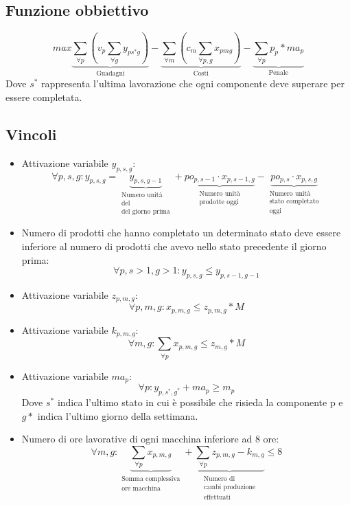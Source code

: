 \documentclass[12pt]{article}
\begin{document}
	\subsection{Funzione obbiettivo}
	$$
		max 
		\underbrace{\sum\limits_{\forall p} (v_p \sum\limits_{\forall g} y_{ps^*g})}_\textrm{Guadagni}
		-
		\underbrace{\sum\limits_{\forall m}(c_m \sum\limits_{\forall p,g}x_{pmg})}_\textrm{Costi}
		-
		\underbrace{\sum\limits_{\forall p}p_p*ma_p}_\textrm{Penale}
	$$
	Dove \(s^*\) rappresenta l'ultima lavorazione che ogni componente deve superare per essere completata. 
	\subsection{Vincoli}
	\begin{itemize}
		\item Attivazione variabile \( y_{p,s,g} \):
		$$
			\forall p,s,g:y_{p,s,g}= 
			\underbrace{y_{p,s,g-1}}_{ \substack{\textrm{Numero unità }\\ \textrm{del} \\ \textrm{del giorno prima}}}
			+
			\underbrace{po_{p,s-1} \cdot x_{p,s-1,g}}_{\substack{\textrm{Numero unità}\\ \textrm{prodotte oggi}}}
			-
			\underbrace{po_{p,s} \cdot x_{p,s,g}}_{\substack{\textrm{Numero unità }\\ \textrm{stato completato} \\ \textrm{oggi}}}
		$$
		\item Numero di prodotti che hanno completato un determinato stato deve essere inferiore al numero di prodotti che avevo nello stato precedente il giorno prima:
		$$
			\forall p,s>1,g>1 : y_{p,s,g} \leq y_{p,s-1,g-1}
		$$
		\item Attivazione variabile \( z_{p,m,g} \):
		$$
			\forall p,m,g : x_{p,m,g}\leq z_{p,m,g}*M
		$$
		\item Attivazione variabile \( k_{p,m,g} \):
		$$
			\forall m,g : \sum\limits_{\forall p} x_{p,m,g}\leq z_{m,g}*M
		$$
		\item Attivazione variabile \(ma_p\):
		$$
			\forall p : y_{p,s^*,g^*}+ma_p \geq m_p
		$$
		Dove \(s^*\) indica l'ultimo stato in cui è possibile che risieda la componente p e \(g*\) indica l'ultimo giorno della settimana.
		\item Numero di ore lavorative di ogni macchina inferiore ad 8 ore:
		$$
			\forall m,g : 
			\underbrace{\sum\limits_{\forall p}x_{p,m,g}}_{\substack{\textrm{Somma complessiva}\\ \textrm{ore macchina}}}
			+
			\underbrace{\sum\limits_{\forall p}z_{p,m,g}-k_{m,g}}_{\substack{\textrm{Numero di}\\ \textrm{cambi produzione} \\ \textrm{effettuati}}}
			\leq 8
		$$
	\end{itemize}
\end{document}
